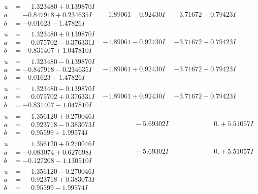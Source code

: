 \documentclass[1p]{elsarticle_modified}
\theoremstyle{definition}
\begin{document}
$$\begin{array}{c|c|c}
\begin{aligned}
u &= \phantom{-}1.323480 + 0.139870 I \\
a &= -0.847918 + 0.234635 I \\
b &= -0.01623 - 1.47826 I\end{aligned}
 & -1.89061 - 0.92430 I & -3.71672 + 0.79423 I \\ \hline\begin{aligned}
u &= \phantom{-}1.323480 + 0.139870 I \\
a &= \phantom{-}0.075702 - 0.376331 I \\
b &= -0.831407 + 1.047810 I\end{aligned}
 & -1.89061 - 0.92430 I & -3.71672 + 0.79423 I \\ \hline\begin{aligned}
u &= \phantom{-}1.323480 - 0.139870 I \\
a &= -0.847918 - 0.234635 I \\
b &= -0.01623 + 1.47826 I\end{aligned}
 & -1.89061 + 0.92430 I & -3.71672 - 0.79423 I \\ \hline\begin{aligned}
u &= \phantom{-}1.323480 - 0.139870 I \\
a &= \phantom{-}0.075702 + 0.376331 I \\
b &= -0.831407 - 1.047810 I\end{aligned}
 & -1.89061 + 0.92430 I & -3.71672 - 0.79423 I \\ \hline\begin{aligned}
u &= \phantom{-}1.356120 + 0.270046 I \\
a &= \phantom{-}0.923718 - 0.383073 I \\
b &= \phantom{-}0.95599 + 1.99574 I\end{aligned}
 & \phantom{-0.000000 } -5.69302 I & \phantom{-0.000000 -}0. + 5.51057 I \\ \hline\begin{aligned}
u &= \phantom{-}1.356120 + 0.270046 I \\
a &= -0.083074 + 0.627698 I \\
b &= -0.127208 - 1.130510 I\end{aligned}
 & \phantom{-0.000000 } -5.69302 I & \phantom{-0.000000 -}0. + 5.51057 I \\ \hline\begin{aligned}
u &= \phantom{-}1.356120 - 0.270046 I \\
a &= \phantom{-}0.923718 + 0.383073 I \\
b &= \phantom{-}0.95599 - 1.99574 I\end{aligned}

\end{array}$$
\end{document}
